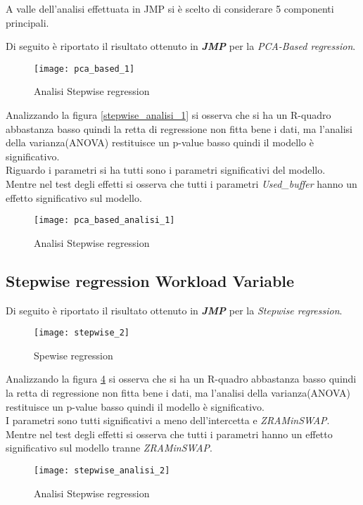 A valle dell'analisi effettuata in JMP si è scelto di considerare 5 componenti
principali.\\

\clearpage

Di seguito è riportato il risultato ottenuto in \textbf{\textit{JMP}} per
la \textit{PCA-Based regression}.\\

\begin{figure}[!htbp]
  \centering
  \texttt{[image: pca\_based\_1]}
  \caption{Analisi Stepwise regression}
  \label{pca_based_1}
\end{figure}

\clearpage

Analizzando la figura \ref{stepwise_analisi_1} si osserva che si ha un R-quadro
abbastanza basso quindi la retta di regressione non fitta bene i dati, ma l'analisi
della varianza(ANOVA) restituisce un p-value basso quindi il modello è significativo.\\
Riguardo i parametri si ha tutti sono i parametri significativi
del modello.\\
Mentre nel test degli effetti si osserva che tutti i parametri \textit{Used\_buffer}
hanno un effetto significativo sul modello.\\

\begin{figure}[!htbp]
  \centering
  \texttt{[image: pca\_based\_analisi\_1]}
  \caption{Analisi Stepwise regression}
  \label{pca_based_analisi_1}
\end{figure}

\clearpage

\subsection{Stepwise regression Workload Variable}

Di seguito è riportato il risultato ottenuto in \textbf{\textit{JMP}} per
la \textit{Stepwise regression}.\\

\begin{figure}[!htbp]
  \centering
  \texttt{[image: stepwise\_2]}
  \caption{Spewise regression}
  \label{stepwise_2}
\end{figure}
\clearpage
Analizzando la figura \ref{stepwise_analisi_2} si osserva che si ha un R-quadro
abbastanza basso quindi la retta di regressione non fitta bene i dati, ma l'analisi
della varianza(ANOVA) restituisce un p-value basso quindi il modello è significativo.\\
I parametri sono tutti significativi a meno dell'intercetta e \textit{ZRAMinSWAP}.
Mentre nel test degli effetti si osserva che tutti i parametri hanno un effetto
significativo sul modello tranne \textit{ZRAMinSWAP}.
\begin{figure}[!htbp]
  \centering
  \texttt{[image: stepwise\_analisi\_2]}
  \caption{Analisi Stepwise regression}
  \label{stepwise_analisi_2}
\end{figure}

